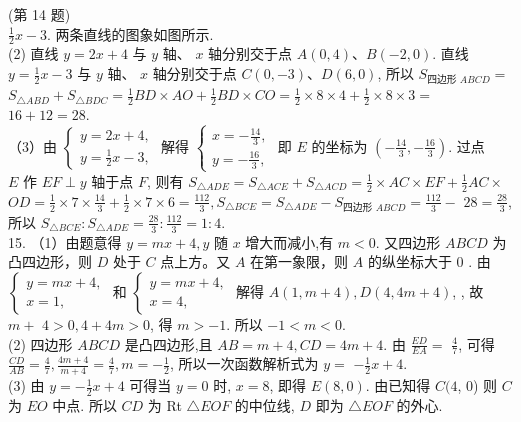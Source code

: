 \documentclass[10pt]{article}
\begin{document}
(第 14 题)\\
$\frac{1}{2} x-3$. 两条直线的图象如图所示.\\
(2) 直线 $y=2 x+4$ 与 $y$ 轴、 $x$ 轴分别交于点 $A(0,4) 、 B(-2,0)$. 直线 $y=\frac{1}{2} x-3$ 与 $y$ 轴、 $x$ 轴分别交于点 $C(0,-3) 、 D(6,0)$, 所以 $S_{\text {四边形 } A B C D}=$ $S_{\triangle A B D}+S_{\triangle B D C}=\frac{1}{2} B D \times A O+\frac{1}{2} B D \times C O=\frac{1}{2} \times 8 \times 4+\frac{1}{2} \times 8 \times 3=$ $16+12=28$.\\
（3）由 $\left\{\begin{array}{l}y=2 x+4, \\ y=\frac{1}{2} x-3,\end{array}\right.$ 解得 $\left\{\begin{array}{l}x=-\frac{14}{3}, \\ y=-\frac{16}{3},\end{array}\right.$ 即 $E$ 的坐标为 $\left(-\frac{14}{3},-\frac{16}{3}\right)$. 过点\\
$E$ 作 $E F \perp y$ 轴于点 $F$, 则有 $S_{\triangle A D E}=S_{\triangle A C E}+S_{\triangle A C D}=\frac{1}{2} \times A C \times E F+\frac{1}{2} A C \times$ $O D=\frac{1}{2} \times 7 \times \frac{14}{3}+\frac{1}{2} \times 7 \times 6=\frac{112}{3}, S_{\triangle B C E}=S_{\triangle A D E}-S_{\text {四边形 } A B C D}=\frac{112}{3}-$ $28=\frac{28}{3}$, 所以 $S_{\triangle B C E}: S_{\triangle A D E}=\frac{28}{3}: \frac{112}{3}=1: 4$.\\
15. （1）由题意得 $y=m x+4, y$ 随 $x$ 增大而减小,有 $m<0$. 又四边形 $A B C D$ 为凸四边形，则 $D$ 处于 $C$ 点上方。又 $A$ 在第一象限，则 $A$ 的纵坐标大于 0 . 由 $\left\{\begin{array}{l}y=m x+4, \\ x=1,\end{array}\right.$ 和 $\left\{\begin{array}{l}y=m x+4, \\ x=4,\end{array}\right.$ 解得 $A(1, m+4), D(4,4 m+4)$, , 故 $m+$ $4>0,4+4 m>0$, 得 $m>-1$. 所以 $-1<m<0$.\\
(2) 四边形 $A B C D$ 是凸四边形,且 $A B=m+4, C D=4 m+4$. 由 $\frac{E D}{E A}=$ $\frac{4}{7}$, 可得 $\frac{C D}{A B}=\frac{4}{7}, \frac{4 m+4}{m+4}=\frac{4}{7}, m=-\frac{1}{2}$, 所以一次函数解析式为 $y=$ $-\frac{1}{2} x+4$.\\
(3) 由 $y=-\frac{1}{2} x+4$ 可得当 $y=0$ 时, $x=8$, 即得 $E(8,0)$. 由已知得 $C(4$, 0) 则 $C$ 为 $E O$ 中点. 所以 $C D$ 为 Rt $\triangle E O F$ 的中位线, $D$ 即为 $\triangle E O F$ 的外心.
\end{document}
